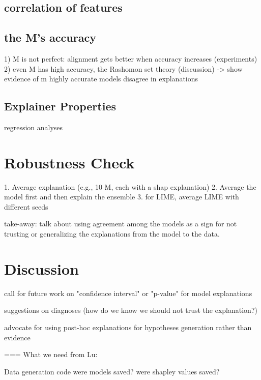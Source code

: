 \documentclass[11pt]{article}
\begin{document}
\subsection{correlation of features}

\subsection{the M's accuracy }
    1) M is not perfect: alignment gets better when accuracy increases (experiments)
    2) even M has high accuracy, the Rashomon set theory (discussion) -> show evidence of m highly accurate models disagree in explanations

\subsection{Explainer Properties}


regression analyses

\section{Robustness Check}
1. Average explanation (e.g., 10 M, each with a shap explanation)
2. Average the model first and then explain the ensemble
3. for LIME, average LIME with different seeds

take-away: talk about using agreement among the models as a sign for not trusting or generalizing the explanations from the model to the data. 
\section{Discussion}


call for future work on "confidence interval" or "p-value" for model explanations

suggestions on diagnoses (how do we know we should not trust the explanation?)

advocate for using post-hoc explanations for hypotheses generation rather than evidence



===
What we need from Lu:

Data generation code
were models saved? were shapley values saved?
\end{document}
